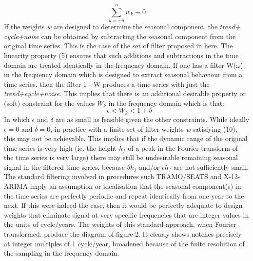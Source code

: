 \documentclass{article}
\begin{document}
\begin{equation}
\sum \limits_{k=-n}^n w_k \equiv 0
\end{equation}
If the weights \textit{w} are designed to determine the seasonal component, the \textit{trend+ cycle+noise} can be obtained by subtracting the seasonal component from the original time series. This is the case of the set of filter proposed in here. The linearity property (5) ensures that such additions and subtractions in the time domain are treated identically in the frequency domain. If one has a filter W($\omega$) in the frequency domain which is designed to extract seasonal behaviour from a time series, then the filter 1 - W produces a time series with just the \textit{trend+cycle+noise}. This implies that there is an additional desirable property or (soft) constraint for the values $W_k$ in the frequency domain which is that:
\begin{equation}
-\epsilon < W_k < 1+\delta
\end{equation}
In which $\epsilon$ and $\delta$ are as small as feasible given the other constraints. While ideally $\epsilon=0$ and $\delta=0$, in practice with a finite set of filter weights \textit{w} satisfying (10), this may not be achievable. This implies that if the dynamic range of the original time series is very high (ie. the height $h_f$ of a peak in the Fourier transform of the time series is very large) there may still be undesirable remaining seasonal signal in the filtered time series, because $\delta h_f$ and/or $\epsilon h_f$ are not sufficiently small.\\The standard filtering involved in procedures such TRAMO/SEATS and X-13-ARIMA imply an assumption or idealisation that the seasonal component(s) in the time series are perfectly periodic and repeat identically from one year to the next. If this were indeed the case, then it would be perfectly adequate to design weights that eliminate signal at very specific frequencies that are integer values in the units of cycle/years. The weights of this standard approach, when Fourier transformed, produce the diagram of figure 2. It clearly shows notches precisely at integer multiples of 1 cycle/year, broadened because of the finite resolution of the sampling in the frequency domain.\\
\end{document}
